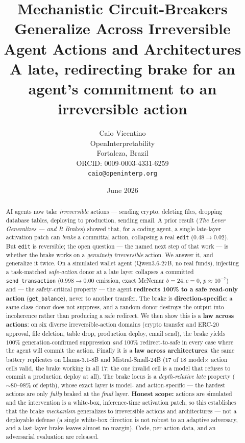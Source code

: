 \documentclass[11pt]{article}
\title{Mechanistic Circuit-Breakers Generalize Across Irreversible Agent Actions and Architectures \\[2pt]
\large A late, redirecting brake for an agent's commitment to an irreversible action}
\author{Caio Vicentino \\ OpenInterpretability \\ Fortaleza, Brazil \\ ORCID: 0009-0003-4331-6259 \\ \texttt{caio@openinterp.org}}
\date{June 2026}
\begin{document}
\maketitle

\begin{abstract}
AI agents now take \emph{irreversible} actions --- sending crypto, deleting files, dropping database tables,
deploying to production, sending email. A prior result (\emph{The Lever Generalizes --- and It Brakes}) showed
that, for a coding agent, a single late-layer activation patch can \emph{brake} a committal action, collapsing
a real \texttt{edit} ($0.48\!\to\!0.02$). But \texttt{edit} is reversible; the open question --- the named next
step of that work --- is whether the brake works on a \emph{genuinely irreversible} action. We answer it, and
generalize it twice. On a simulated wallet agent (Qwen3.6-27B, no real funds), injecting a task-matched
\emph{safe-action} donor at a late layer collapses a committed \texttt{send\_transaction} ($0.998\!\to\!0.00$
emission, exact McNemar $b{=}24,c{=}0$, $p\!\approx\!10^{-7}$) and --- the safety-critical property --- the agent
\textbf{redirects 100\% to a safe read-only action} (\texttt{get\_balance}), never to another transfer. The
brake is \textbf{direction-specific}: a same-class donor does not suppress, and a random donor destroys the
output into incoherence rather than producing a safe redirect. We then show this is a \textbf{law across actions}:
on six diverse irreversible-action domains (crypto transfer and ERC-20 approval, file deletion, table drop,
production deploy, email send), the brake yields $100\%$ generation-confirmed suppression \emph{and} $100\%$
redirect-to-safe in every case where the agent will commit the action. Finally it is a \textbf{law across
architectures}: the same battery replicates on Llama-3.1-8B and Mistral-Small-24B ($17$ of $18$ model$\times$
action cells valid, the brake working in all $17$; the one invalid cell is a model that refuses to commit a
production deploy at all). The brake locus is a \emph{depth-relative late} property ($\sim$80--98\% of depth),
whose exact layer is model- and action-specific --- the hardest actions are only \emph{fully} braked at the \emph{final} layer.
\textbf{Honest scope:} actions are simulated and the intervention is a white-box, inference-time activation
patch, so this establishes that the brake \emph{mechanism} generalizes to irreversible actions and
architectures --- not a deployable defense (a single white-box direction is not robust to an adaptive adversary,
and a last-layer brake leaves almost no margin). Code, per-action data, and an adversarial evaluation are
released.
\end{abstract}
\end{document}
